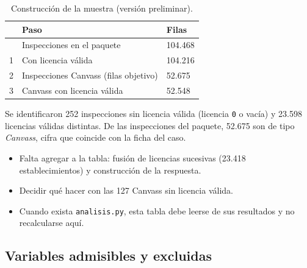 \documentclass[
  spanish,
  letterpaper,
  DIV=11,
  numbers=noendperiod]{scrartcl}
\providecommand{\tightlist}{%
  \setlength{\itemsep}{0pt}\setlength{\parskip}{0pt}}
\begin{document}
\begin{longtable}[]{@{}lll@{}}

\caption{\label{tbl-construccion}Construcción de la muestra (versión
preliminar).}

\tabularnewline

\toprule\noalign{}
& Paso & Filas \\
\midrule\noalign{}
\endhead
\bottomrule\noalign{}
\endlastfoot
0 & Inspecciones en el paquete & 104.468 \\
1 & Con licencia válida & 104.216 \\
2 & Inspecciones Canvass (filas objetivo) & 52.675 \\
3 & Canvass con licencia válida & 52.548 \\

\end{longtable}

Se identificaron 252 inspecciones sin licencia válida (licencia
\texttt{0} o vacía) y 23.598 licencias válidas distintas. De las
inspecciones del paquete, 52.675 son de tipo \emph{Canvass}, cifra que
coincide con la ficha del caso.

\begin{tcolorbox}[enhanced jigsaw, toptitle=1mm, bottomrule=.15mm, breakable, opacityback=0, title=\textcolor{quarto-callout-note-color}{\faInfo}\hspace{0.5em}{Notas del equipo}, toprule=.15mm, bottomtitle=1mm, colframe=quarto-callout-note-color-frame, rightrule=.15mm, titlerule=0mm, colback=white, arc=.35mm, left=2mm, opacitybacktitle=0.6, coltitle=black, leftrule=.75mm, colbacktitle=quarto-callout-note-color!10!white]

\begin{itemize}
\tightlist
\item
  Falta agregar a la tabla: fusión de licencias sucesivas (23.418
  establecimientos) y construcción de la respuesta.
\item
  Decidir qué hacer con las 127 Canvass sin licencia válida.
\item
  Cuando exista \texttt{analisis.py}, esta tabla debe leerse de sus
  resultados y no recalcularse aquí.
\end{itemize}

\end{tcolorbox}

\subsection{Variables admisibles y
excluidas}\label{variables-admisibles-y-excluidas}
\end{document}
